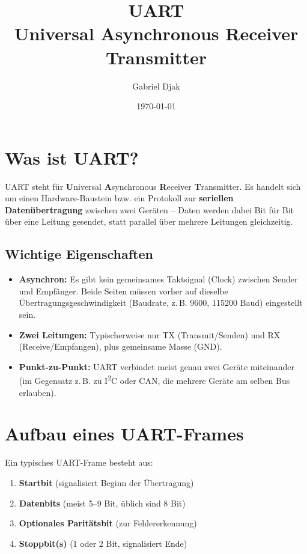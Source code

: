 \documentclass[a4paper,11pt]{article}
\title{\textbf{UART \\ \large Universal Asynchronous Receiver Transmitter}}
\author{Gabriel Djak}
\date{\today}
\begin{document}
\maketitle
\vspace{-0.8cm}

\section*{Was ist UART?}

UART steht für \textbf{U}niversal \textbf{A}synchronous \textbf{R}eceiver \textbf{T}ransmitter. Es handelt sich um einen Hardware-Baustein bzw. ein Protokoll zur \textbf{seriellen Datenübertragung} zwischen zwei Geräten -- Daten werden dabei Bit für Bit über eine Leitung gesendet, statt parallel über mehrere Leitungen gleichzeitig.

\subsection*{Wichtige Eigenschaften}

\begin{itemize}[leftmargin=1.5em]
    \item \textbf{Asynchron:} Es gibt kein gemeinsames Taktsignal (Clock) zwischen Sender und Empfänger. Beide Seiten müssen vorher auf dieselbe Übertragungsgeschwindigkeit (Baudrate, z.\,B. 9600, 115200 Baud) eingestellt sein.
    \item \textbf{Zwei Leitungen:} Typischerweise nur TX (Transmit/Senden) und RX (Receive/Empfangen), plus gemeinsame Masse (GND).
    \item \textbf{Punkt-zu-Punkt:} UART verbindet meist genau zwei Geräte miteinander (im Gegensatz z.\,B. zu I\textsuperscript{2}C oder CAN, die mehrere Geräte am selben Bus erlauben).
\end{itemize}

\section*{Aufbau eines UART-Frames}

Ein typisches UART-Frame besteht aus:

\begin{enumerate}[leftmargin=1.5em]
    \item \textbf{Startbit} (signalisiert Beginn der Übertragung)
    \item \textbf{Datenbits} (meist 5--9 Bit, üblich sind 8 Bit)
    \item \textbf{Optionales Paritätsbit} (zur Fehlererkennung)
    \item \textbf{Stoppbit(s)} (1 oder 2 Bit, signalisiert Ende)
\end{enumerate}
\end{document}
